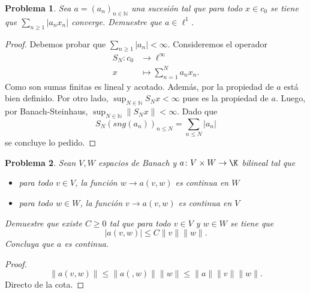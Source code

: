 \documentclass{article}
\theoremstyle{plain}
\newtheorem{Problema}{Problema}
\theoremstyle{definition}
\newcommand{\N}{\mathbb{N}}
\newcommand{\abs}[1]{\lvert #1 \rvert}
\newcommand{\norm}[1]{\lVert #1 \rVert}
\begin{document}
\begin{Problema}
  Sea \(a = (a_n)_{n\in\N}\) una sucesión tal que para todo \(x\in c_0\) se tiene que
  \(\sum_{n\ge 1} \abs{a_n x_n} \) converge. Demuestre que \(a\in \ell^1\).  
\end{Problema}
\begin{proof}
  Debemos probar que \(\sum_{n\ge 1} \abs{a_n} < \infty\).
  Consideremos el operador
  \begin{align*}
    S_N \colon c_0 &\to \ell^{\infty} 
    \\ x&\mapsto \sum_{n=1}^{N} a_n x_n.
  \end{align*}
  Como son sumas finitas es lineal y acotado. Además, por la propiedad de \(a\) está bien definido. 
  Por otro lado, \(\sup_{N\in \N} S_N x < \infty\) pues es la propiedad de \(a\). Luego, por 
  Banach-Steinhaus, \(\sup_{N\in \N} \norm{ S_N x } < \infty\). Dado que
  \begin{displaymath}
    S_N (sng(a_n))_{n\le N} = \sum_{n\le N} \abs{a_n}
  \end{displaymath}
  se concluye lo pedido.
\end{proof}

\begin{Problema}
  Sean \(V,W\) espacios de Banach y \(a\colon V\times W \to \K\) bilineal tal que
  \begin{itemize}
    \item para todo \(v\in V\), la función \(w\to a(v,w)\) es continua en \(W\)   
    \item para todo \(w\in W\), la función \(v\to a(v,w)\) es continua en \(V\)   
  \end{itemize}
  Demuestre que existe \(C\ge 0\) tal que para todo \(v\in V\) y \(w\in W\) se tiene que
  \begin{displaymath}
    \abs{a(v,w)} \le C \norm{v} \norm{w}.
  \end{displaymath}
  Concluya que \(a\) es continua. 
\end{Problema}
\begin{proof}
\begin{displaymath}
  \norm{a(v,w)} \le \norm{a(,w)} \norm{w} \le \norm{a} \norm{v} \norm{w}.
\end{displaymath}
Directo de la cota.
\end{proof}
\end{document}
